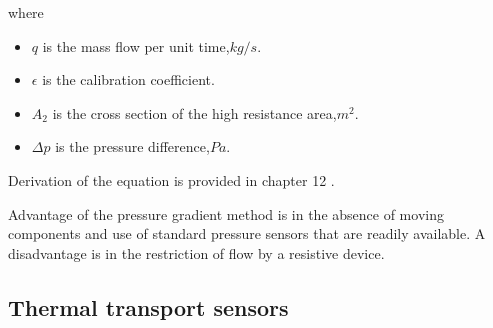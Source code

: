 where
\begin{itemize}
	\item $ q $ is the mass flow per unit time,$ \unit{kg/s} $.
	\item $ \epsilon $ is the calibration coefficient.
	\item $ A_2 $ is the cross section of the high resistance area,$ \unit{m^2} $.
	\item $ \Delta p$ is the pressure difference,$\unit{Pa} $.
\end{itemize}

Derivation of the equation is provided in chapter 12 \cite{handbook}.

Advantage of the pressure gradient method is in the absence of moving components and use of standard pressure sensors that are readily available. A disadvantage is in the restriction of flow by a resistive device.

\subsection{Thermal transport sensors}

